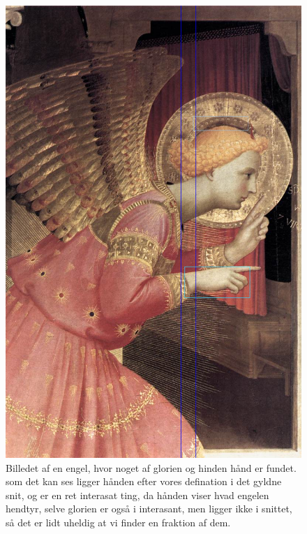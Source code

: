 \begin{figure}[h!!]
	\begin{center}
		\includegraphics[scale=0.30,angle=0]{afsnit/afprovning/billeder/BB1annunc2.png}
	\end{center}
	\caption[]{Billedet af en engel, hvor noget af glorien og hinden
	           hånd er fundet. som det kan ses ligger hånden efter vores
	           defination i det gyldne snit, og er en ret interasat
	           ting, da hånden viser hvad engelen hendtyr, selve glorien
	           er også i interasant, men ligger ikke i snittet, så det
	           er lidt uheldig at vi finder en fraktion af dem.}
	\label{BB1annunc2}
\end{figure}

